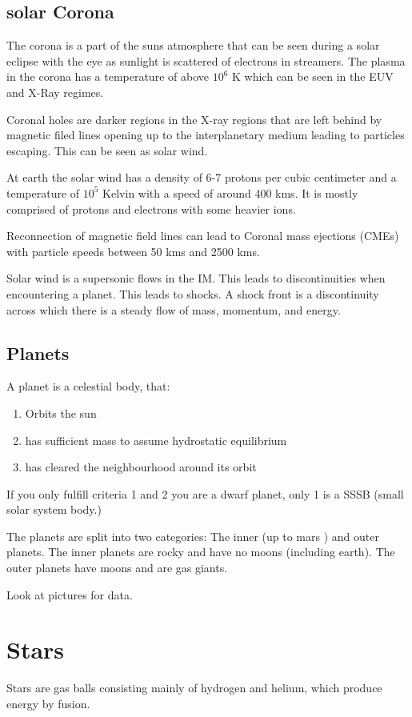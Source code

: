 \documentclass[11pt,a4paper]{article}
\begin{document}
\subsection{solar Corona}
The corona is a part of the suns atmosphere that can be seen during a solar eclipse with the eye as sunlight is scattered of electrons in streamers. 
The plasma in the corona has a temperature of above $10^6$ K which can be seen in the EUV and X-Ray regimes. 

Coronal holes are darker regions in the X-ray regions that are left behind by magnetic filed lines opening up to the interplanetary medium leading to particles escaping. 
This can be seen as solar wind.

At earth the solar wind has a density of 6-7 protons per cubic centimeter and a temperature of $10^5$ Kelvin with a speed of around 400 kms.
It is mostly comprised of protons and electrons with some heavier ions.

Reconnection of magnetic field lines can lead to Coronal mass ejections (CMEs) with particle speeds between 50 kms and 2500 kms. 

Solar wind is a supersonic flows in the IM. This leads to discontinuities when encountering a planet. 
This leads to shocks. 
A shock front is a discontinuity across which there is a steady flow of
mass, momentum, and energy.
\subsection{Planets}
A planet is a celestial body, that: 
\begin{enumerate}
    \item Orbits the sun
    \item has sufficient mass to assume hydrostatic equilibrium
    \item has cleared the neighbourhood around its orbit 
\end{enumerate}
If you only fulfill criteria 1 and 2 you are a dwarf planet, only 1 is a SSSB (small solar system body.)

The planets are split into two categories: 
The inner (up to mars ) and outer planets. 
The inner planets are rocky and have no moons (including earth). 
The outer planets have moons and are gas giants. 

Look at pictures for data.

\section{Stars}
Stars are gas balls consisting mainly of hydrogen and helium, which produce energy by fusion.
\end{document}
